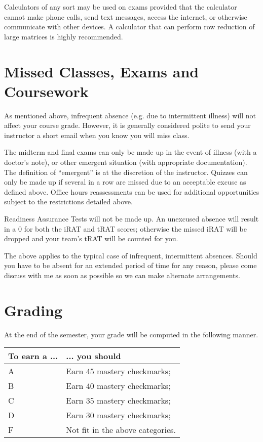\documentclass{article}
\begin{document}
Calculators of any sort may be used on exams provided that the calculator cannot make phone calls, send text messages, access the internet, or otherwise communicate with other devices.  A calculator that can perform row reduction of large matrices is highly recommended.

\section*{\fontsize{12}{15}\selectfont Missed Classes, Exams and Coursework}

As mentioned above, infrequent absence (e.g. due to intermittent illness) will not affect your course grade.  However, it is generally considered polite to send your instructor a short email when you know you will miss class.  

The midterm and final exams can only be made up in the event of illness (with a doctor's note), or other emergent situation (with appropriate documentation).  The definition of ``emergent'' is at the discretion of the instructor. Quizzes can only be made up if several in a row are missed due to an acceptable excuse as defined above.  Office hours reassessments can be used for additional opportunities subject to the restrictions detailed above.

Readiness Assurance Tests will not be made up. An unexcused absence will result in a 0 for both the iRAT and tRAT scores; otherwise the missed iRAT will be dropped and your team's tRAT will be counted for you.   

The above applies to the typical case of infrequent, intermittent absences. Should you have to be absent for an extended period of time for any reason, please come discuss with me as soon as possible so we can make alternate arrangements.

\noindent \begin{minipage}{\textwidth}
\section*{\fontsize{12}{15}\selectfont Grading}
At the end of the semester, your grade will be computed in the following manner.  \\

\begin{center}
 \begin{tabular}{l|l} 
To earn a  ... & ... you should \\
\hline
A & Earn 45 mastery checkmarks;  \\
\hline

B &  Earn 40 mastery checkmarks; \\
\hline

C 	&Earn 35 mastery checkmarks;\\
\hline

D & Earn 30 mastery checkmarks;\\
\hline

F 	& Not fit in the above categories. \\
\hline
\end{tabular}
\end{center}
\end{minipage}
\end{document}
